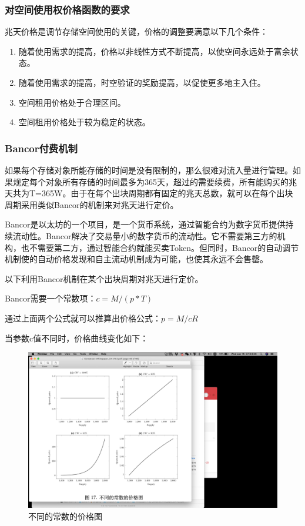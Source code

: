 \documentclass[a4paper,12pt]{article}
\begin{document}
\subsubsection{对空间使用权价格函数的要求}

兆天价格是调节存储空间使用的关键，价格的调整要满意以下几个条件：

\begin{enumerate}
\item 随着使用需求的提高，价格以非线性方式不断提高，以使空间永远处于富余状态。
\item 随着使用需求的提高，时空验证的奖励提高，以促使更多地主入住。
\item 空间租用价格处于合理区间。
\item 空间租用价格处于较为稳定的状态。
\end{enumerate}

\subsubsection{Bancor付费机制}

如果每个存储对象所能存储的时间是没有限制的，那么很难对流入量进行管理。如果规定每个对象所有存储的时间最多为365天，超过的需要续费，所有能购买的兆天共为T=365W。由于在每个出块周期都有固定的兆天总数，就可以在每个出块周期采用类似Bancor的机制来对兆天进行定价。

Bancor是以太坊的一个项目，是一个货币系统，通过智能合约为数字货币提供持续流动性。Bancor解决了交易量小的数字货币的流动性。它不需要第三方的机构，也不需要第二方，通过智能合约就能买卖Token。但同时，Bancor的自动调节机制使的自动价格发现和自主流动机制成为可能，也使其永远不会售罄。

以下利用Bancor机制在某个出块周期对兆天进行定价。%

Bancor需要一个常数项：$c=M/(p*T)$

通过上面两个公式就可以推算出价格公式：$p=M/cR$

当参数c值不同时，价格曲线变化如下：

\begin{figure} [htbp]
\centering \includegraphics [width = 5in]{pic_cn/different_CW.png}
\caption{不同的常数的价格图} \label{fig:different_CW}
\end{figure}
\end{document}
